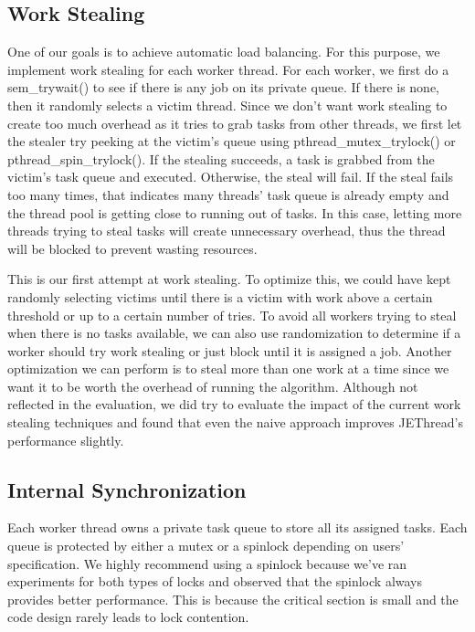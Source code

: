 \documentclass[journal, a4paper]{IEEEtran}
\begin{document}
\subsection{Work Stealing}
One of our goals is to achieve automatic load balancing. For this purpose, we implement work stealing for each worker thread. For each worker, we first do a sem\_trywait() to see if there is any job on its private queue. If there is none, then it randomly selects a victim thread. Since we don't want work stealing to create too much overhead as it tries to grab tasks from other threads, we first let the stealer try peeking at the victim's queue using pthread\_mutex\_trylock() or pthread\_spin\_trylock(). If the stealing succeeds, a task is grabbed from the victim's task queue and executed. Otherwise, the steal will fail. If the steal fails too many times, that indicates many threads' task queue is already empty and the thread pool is getting close to running out of tasks. In this case, letting more threads trying to steal tasks will create unnecessary overhead, thus the thread will be blocked to prevent wasting resources. 

This is our first attempt at work stealing. To optimize this, we could have kept randomly selecting victims until there is a victim with work above a certain threshold or up to a certain number of tries. To avoid all workers trying to steal when there is no tasks available, we can also use randomization to determine if a worker should try work stealing or just block until it is assigned a job. Another optimization we can perform is to steal more than one work at a time since we want it to be worth the overhead of running the algorithm. Although not reflected in the evaluation, we did try to evaluate the impact of the current work stealing techniques and found that even the naive approach improves JEThread's performance slightly.


\subsection{Internal Synchronization}
Each worker thread owns a private task queue to store all its assigned tasks. Each queue is protected by either a mutex or a spinlock depending on users' specification. We highly recommend using a spinlock because we've ran experiments for both types of locks and observed that the spinlock always provides better performance. This is because the critical section is small and the code design rarely leads to lock contention. 
\end{document}
